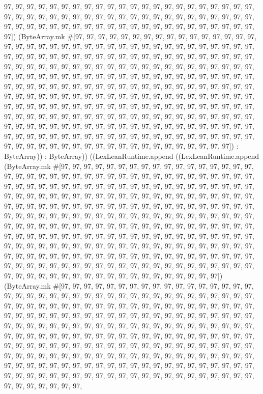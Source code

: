 \documentclass[11pt]{article}
\begin{document}
97, 97, 97, 97, 97, 97, 97, 97, 97, 97, 97, 97, 97, 97, 97, 97, 97, 97, 97, 97, 97, 97, 97, 97, 97, 97, 97, 97, 97, 97, 97, 97, 97, 97, 97, 97, 97, 97, 97, 97, 97, 97, 97, 97, 97, 97, 97, 97, 97, 97, 97, 97, 97, 97, 97, 97, 97, 97, 97, 97, 97, 97, 97, 97, 97, 97, 97]) (ByteArray.mk \#[97, 97, 97, 97, 97, 97, 97, 97, 97, 97, 97, 97, 97, 97, 97, 97, 97, 97, 97, 97, 97, 97, 97, 97, 97, 97, 97, 97, 97, 97, 97, 97, 97, 97, 97, 97, 97, 97, 97, 97, 97, 97, 97, 97, 97, 97, 97, 97, 97, 97, 97, 97, 97, 97, 97, 97, 97, 97, 97, 97, 97, 97, 97, 97, 97, 97, 97, 97, 97, 97, 97, 97, 97, 97, 97, 97, 97, 97, 97, 97, 97, 97, 97, 97, 97, 97, 97, 97, 97, 97, 97, 97, 97, 97, 97, 97, 97, 97, 97, 97, 97, 97, 97, 97, 97, 97, 97, 97, 97, 97, 97, 97, 97, 97, 97, 97, 97, 97, 97, 97, 97, 97, 97, 97, 97, 97, 97, 97, 97, 97, 97, 97, 97, 97, 97, 97, 97, 97, 97, 97, 97, 97, 97, 97, 97, 97, 97, 97, 97, 97, 97, 97, 97, 97, 97, 97, 97, 97, 97, 97, 97, 97, 97, 97, 97, 97, 97, 97, 97, 97, 97, 97, 97, 97, 97, 97, 97, 97, 97, 97, 97, 97, 97, 97, 97, 97, 97, 97, 97, 97, 97, 97, 97, 97, 97, 97, 97, 97, 97, 97, 97, 97, 97, 97, 97, 97, 97, 97, 97, 97, 97, 97, 97, 97, 97, 97, 97, 97, 97, 97, 97, 97, 97, 97, 97, 97, 97, 97, 97, 97, 97, 97, 97, 97, 97, 97, 97, 97, 97, 97, 97, 97, 97, 97, 97, 97, 97, 97, 97, 97, 97, 97, 97, 97, 97, 97]) : ByteArray)) : ByteArray)) ((LexLeanRuntime.append ((LexLeanRuntime.append (ByteArray.mk \#[97, 97, 97, 97, 97, 97, 97, 97, 97, 97, 97, 97, 97, 97, 97, 97, 97, 97, 97, 97, 97, 97, 97, 97, 97, 97, 97, 97, 97, 97, 97, 97, 97, 97, 97, 97, 97, 97, 97, 97, 97, 97, 97, 97, 97, 97, 97, 97, 97, 97, 97, 97, 97, 97, 97, 97, 97, 97, 97, 97, 97, 97, 97, 97, 97, 97, 97, 97, 97, 97, 97, 97, 97, 97, 97, 97, 97, 97, 97, 97, 97, 97, 97, 97, 97, 97, 97, 97, 97, 97, 97, 97, 97, 97, 97, 97, 97, 97, 97, 97, 97, 97, 97, 97, 97, 97, 97, 97, 97, 97, 97, 97, 97, 97, 97, 97, 97, 97, 97, 97, 97, 97, 97, 97, 97, 97, 97, 97, 97, 97, 97, 97, 97, 97, 97, 97, 97, 97, 97, 97, 97, 97, 97, 97, 97, 97, 97, 97, 97, 97, 97, 97, 97, 97, 97, 97, 97, 97, 97, 97, 97, 97, 97, 97, 97, 97, 97, 97, 97, 97, 97, 97, 97, 97, 97, 97, 97, 97, 97, 97, 97, 97, 97, 97, 97, 97, 97, 97, 97, 97, 97, 97, 97, 97, 97, 97, 97, 97, 97, 97, 97, 97, 97, 97, 97, 97, 97, 97, 97, 97, 97, 97, 97, 97, 97, 97, 97, 97, 97, 97, 97, 97, 97, 97, 97, 97, 97, 97, 97, 97, 97, 97, 97, 97, 97, 97, 97, 97, 97, 97, 97, 97, 97, 97, 97, 97, 97, 97, 97, 97, 97, 97, 97, 97, 97, 97]) (ByteArray.mk \#[97, 97, 97, 97, 97, 97, 97, 97, 97, 97, 97, 97, 97, 97, 97, 97, 97, 97, 97, 97, 97, 97, 97, 97, 97, 97, 97, 97, 97, 97, 97, 97, 97, 97, 97, 97, 97, 97, 97, 97, 97, 97, 97, 97, 97, 97, 97, 97, 97, 97, 97, 97, 97, 97, 97, 97, 97, 97, 97, 97, 97, 97, 97, 97, 97, 97, 97, 97, 97, 97, 97, 97, 97, 97, 97, 97, 97, 97, 97, 97, 97, 97, 97, 97, 97, 97, 97, 97, 97, 97, 97, 97, 97, 97, 97, 97, 97, 97, 97, 97, 97, 97, 97, 97, 97, 97, 97, 97, 97, 97, 97, 97, 97, 97, 97, 97, 97, 97, 97, 97, 97, 97, 97, 97, 97, 97, 97, 97, 97, 97, 97, 97, 97, 97, 97, 97, 97, 97, 97, 97, 97, 97, 97, 97, 97, 97, 97, 97, 97, 97, 97, 97, 97, 97, 97, 97, 97, 97, 97, 97, 97, 97, 97, 97, 97, 97, 97, 97, 97, 97, 97, 97, 97, 97, 97, 97, 97, 97, 97, 97, 97, 97, 97, 97, 97, 97, 97, 97, 97, 97, 97, 97, 97, 97, 97, 97, 97, 97, 97, 97, 97, 97, 97, 97, 97, 97, 97, 97, 97, 97, 97, 97, 97, 97, 97, 97, 97, 97, 97, 97, 97, 97, 
\end{document}
